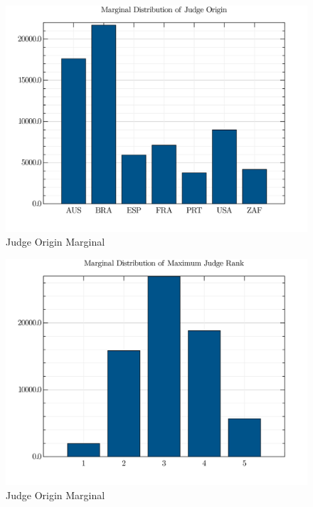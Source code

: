 \documentclass[12pt,a4paper]{article}
\begin{document}
 \begin{figure}
\centering
\includegraphics{visuals/marginals_JUD_orig.png}
\caption{Judge Origin Marginal}
\end{figure}
 \begin{figure}
\centering
\includegraphics{visuals/marginals_MAX_RANK.png}
\caption{Judge Origin Marginal}
\end{figure}
\end{document}
